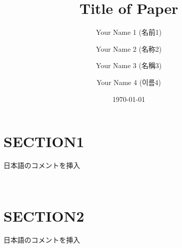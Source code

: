 \documentclass[prb,aps,floatfix,twocolumn,amsmath,amssymb,superscriptaddress]{revtex4-2}
\begin{document}
\title{Title of Paper}

\author{\begin{CJK*}{UTF8}{ipxm} Your Name 1 (名前1)\end{CJK*}}

\author{\begin{CJK*}{UTF8}{gbsn} Your Name 2 (名称2)\end{CJK*}}

\author{\begin{CJK*}{UTF8}{bsmi} Your Name 3 (名稱3)\end{CJK*}}

\author{\begin{CJK*}{UTF8}{mj} Your Name 4 (이름4)\end{CJK*}}

\date{\today}

\begin{abstract}
\lipsum[1]
\end{abstract}

\maketitle


\section{SECTION1}

\lipsum[1-2]

{\color{red}\begin{CJK*}{UTF8}{ipxg}%
日本語のコメントを挿入
\end{CJK*}}

\lipsum[1]~\cite{kohn1965,hohenberg1964,perdew1981}


\section{SECTION2}

\lipsum[1-2]

{\color{red}\begin{CJK*}{UTF8}{ipxg}%
日本語のコメントを挿入
\end{CJK*}}

\lipsum[1]~\cite{ceperley1980,bardeen1957,weinberg1967}




\end{document}
